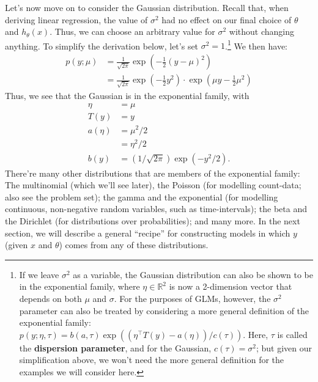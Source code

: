 Let's now move on to consider the Gaussian distribution. Recall that,
when deriving linear regression, the value of $\sigma^2$ had no effect on our final
choice of $\theta$ and $h_\theta (x)$. Thus, we can choose an arbitrary value for $\sigma^2$ without
changing anything. To simplify the derivation below, let's set $\sigma^2 = 1$.\footnote{If we leave $\sigma^2$ as a variable, the Gaussian distribution can also be shown to be in the exponential family, where $\eta \in \mathbb R^2$ is now a 2-dimension vector that depends on both $\mu$ and
$\sigma$. For the purposes of GLMs, however, the $\sigma^2$ parameter can also be treated by considering
a more general definition of the exponential family: $p(y;\eta,\tau) = b(a,\tau)\exp((\eta^\top T(y) - a(\eta))/c(\tau))$.
Here, $\tau$ is called the \textbf{dispersion parameter}, and for the Gaussian, $c(\tau) = \sigma^2$;
but given our simplification above, we won't need the more general definition for the
examples we will consider here.}
We then have:
\begin{align}
    p(y;\mu) &= \frac{1}{\sqrt{2\pi}}\exp\left(-\frac{1}{2} (y - \mu)^2\right)\\
             &= \frac{1}{\sqrt{2\pi}}\exp\left(-\frac{1}{2} y^2 \right) \cdot  \exp\left(\mu y - \frac{1}{2}\mu^2\right)
\end{align}
Thus, we see that the Gaussian is in the exponential family, with
\begin{align*}
    \eta &= \mu\\
    T(y) &= y\\
    a(\eta) &= \mu^2 / 2\\
            &= \eta^2 / 2\\
    b(y) &= (1 / \sqrt{2\pi})\exp(-y^2 / 2).
\end{align*}
There're many other distributions that are members of the exponential family:
The multinomial (which we'll see later), the Poisson (for modelling
count-data; also see the problem set); the gamma and the exponential
(for modelling continuous, non-negative random variables, such as time-intervals);
the beta and the Dirichlet (for distributions over probabilities);
and many more. In the next section, we will describe a general ``recipe''
for constructing models in which $y$ (given $x$ and $\theta$) comes from any of these
distributions.


